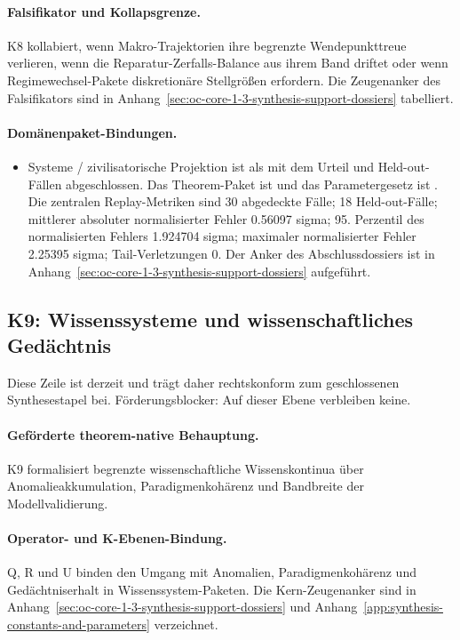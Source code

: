 \paragraph{Falsifikator und Kollapsgrenze.}
K8 kollabiert, wenn Makro-Trajektorien ihre begrenzte Wendepunkttreue verlieren, wenn die Reparatur-Zerfalls-Balance aus ihrem Band driftet oder wenn Regimewechsel-Pakete diskretionäre Stellgrößen erfordern.
Die Zeugenanker des Falsifikators sind in Anhang~\ref{sec:oc-core-1-3-synthesis-support-dossiers} tabelliert.

\paragraph{Domänenpaket-Bindungen.}
\begin{itemize}[leftmargin=1.6em,nosep]
\item Systeme / zivilisatorische Projektion ist als  mit dem Urteil  und  Held-out-Fällen abgeschlossen. Das Theorem-Paket ist  und das Parametergesetz ist . Die zentralen Replay-Metriken sind 30 abgedeckte Fälle; 18 Held-out-Fälle; mittlerer absoluter normalisierter Fehler 0.56097 sigma; 95. Perzentil des normalisierten Fehlers 1.924704 sigma; maximaler normalisierter Fehler 2.25395 sigma; Tail-Verletzungen 0. Der Anker des Abschlussdossiers ist in Anhang~\ref{sec:oc-core-1-3-synthesis-support-dossiers} aufgeführt.
\end{itemize}

\subsection{K9: Wissenssysteme und wissenschaftliches Gedächtnis}
\label{sec:oc-core-1-3-synthesis-k9}
Diese Zeile ist derzeit  und trägt daher rechtskonform zum geschlossenen Synthesestapel bei.
Förderungsblocker: Auf dieser Ebene verbleiben keine.

\paragraph{Geförderte theorem-native Behauptung.}
K9 formalisiert begrenzte wissenschaftliche Wissenskontinua über Anomalieakkumulation, Paradigmenkohärenz und Bandbreite der Modellvalidierung.

\paragraph{Operator- und K-Ebenen-Bindung.}
Q, R und U binden den Umgang mit Anomalien, Paradigmenkohärenz und Gedächtniserhalt in Wissenssystem-Paketen.
Die Kern-Zeugenanker sind in Anhang~\ref{sec:oc-core-1-3-synthesis-support-dossiers} und Anhang~\ref{app:synthesis-constants-and-parameters} verzeichnet.

